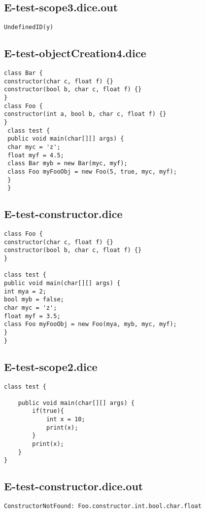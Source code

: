 \subsection{E-test-scope3.dice.out}
\begin{verbatim}
UndefinedID(y)

\end{verbatim}
\pagebreak
\subsection{E-test-objectCreation4.dice}
\begin{verbatim}
class Bar {
constructor(char c, float f) {}
constructor(bool b, char c, float f) {}
}
class Foo {
constructor(int a, bool b, char c, float f) {}
}
 class test {
 public void main(char[][] args) {
 char myc = 'z';
 float myf = 4.5;
 class Bar myb = new Bar(myc, myf);
 class Foo myFooObj = new Foo(5, true, myc, myf);
 }
 }
\end{verbatim}
\pagebreak
\subsection{E-test-constructor.dice}
\begin{verbatim}
class Foo {
constructor(char c, float f) {}
constructor(bool b, char c, float f) {}
}

class test {
public void main(char[][] args) {
int mya = 2;
bool myb = false;
char myc = 'z';
float myf = 3.5;
class Foo myFooObj = new Foo(mya, myb, myc, myf);
}
}

\end{verbatim}
\pagebreak
\subsection{E-test-scope2.dice}
\begin{verbatim}
class test {

	public void main(char[][] args) {
		if(true){
			int x = 10;
			print(x);
		}
		print(x);
	}
}
\end{verbatim}
\pagebreak
\subsection{E-test-constructor.dice.out}
\begin{verbatim}
ConstructorNotFound: Foo.constructor.int.bool.char.float

\end{verbatim}
\pagebreak
